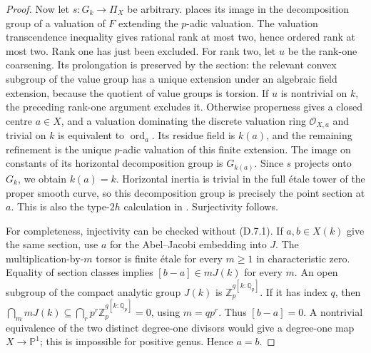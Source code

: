 \begin{proof}
Now let $s:G_k\to\Pi_X$ be arbitrary.
\citet[Theorem 26 in the 2011 preprint]{PopStix2017} places its image in the
decomposition group of a valuation of $F$ extending the $p$-adic valuation.
The valuation transcendence inequality gives rational rank at most two,
hence ordered rank at most two.  Rank one has just been excluded.
For rank two, let $u$ be the rank-one coarsening.  Its prolongation is preserved
by the section: the relevant convex subgroup of the value group has a unique
extension under an algebraic field extension, because the quotient of value
groups is torsion.  If $u$ is nontrivial on $k$, the preceding rank-one
argument excludes it.  Otherwise properness gives a closed centre $a\in X$,
and a valuation dominating the discrete valuation ring $\mathcal O_{X,a}$
and trivial on $k$ is equivalent to $\operatorname{ord}_a$.
Its residue field is $k(a)$, and the remaining refinement is the unique
$p$-adic valuation of this finite extension.  The image on constants of its
horizontal decomposition group is $G_{k(a)}$.  Since $s$ projects onto $G_k$,
we obtain $k(a)=k$.  Horizontal inertia is trivial in the full \'etale tower
of the proper smooth curve, so this decomposition group is precisely the
point section at $a$.  This is also the type-$2h$ calculation in
\citet[Section 6.1]{PopStix2017}.  Surjectivity follows.

For completeness, injectivity can be checked without (D.7.1).  If $a,b\in X(k)$
give the same section, use $a$ for the Abel--Jacobi embedding into $J$.
The multiplication-by-$m$ torsor is finite \'etale for every $m\geq1$ in
characteristic zero.  Equality of section classes implies
$[b-a]\in mJ(k)$ for every $m$.  An open subgroup of the compact analytic
group $J(k)$ is $\mathbb Z_p^{g[k:\mathbb Q_p]}$.  If it has index $q$,
then $\bigcap_m mJ(k)\subseteq\bigcap_r p^r\mathbb Z_p^{g[k:\mathbb Q_p]}=0$,
using $m=qp^r$.  Thus $[b-a]=0$.  A nontrivial equivalence of the two distinct
degree-one divisors would give a degree-one map $X\to\mathbb P^1$;
this is impossible for positive genus.  Hence $a=b$.
\end{proof}

